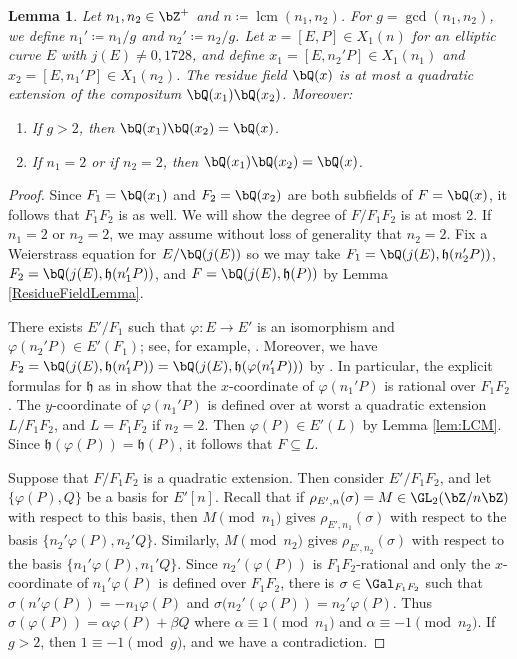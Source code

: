 \documentclass[11pt,reqno]{amsart}
\theoremstyle{plain}
\newtheorem{lemma}[theorem]{Lemma}
\theoremstyle{definition}
\DeclareMathOperator{\lcm}{lcm}
\newcommand{\Q}{\bQ}
\newcommand{\Z}{\bZ}
\begin{document}
\begin{lemma} \label{lem:compositum_res_fields}
Let $n_1,n_2 \in \Z^+$ and $n \coloneqq \lcm(n_1,n_2)$. For $g=\gcd(n_1,n_2)$, we define $n_1'\coloneqq n_1/g$ and $n_2'\coloneqq n_2/g$. Let $x=[E,P] \in X_1(n)$ for an elliptic curve $E$ with $j(E) \neq 0,1728$, and define $x_1=[E,n_2'P] \in X_1(n_1)$ and $x_2=[E,n_1'P] \in X_1(n_2)$. The residue field $\Q(x)$ is at most a quadratic extension of the compositum $\Q(x_1)\Q(x_2)$. Moreover:
\begin{enumerate}
\item If $g>2$, then $\Q(x_1)\Q(x_2)=\Q(x)$.
\item If $n_1=2$ or if $n_2=2$, then $\Q(x_1)\Q(x_2)=\Q(x)$.
\end{enumerate}
\end{lemma}

\begin{proof}
Since $F_1=\Q(x_1)$ and $F_2=\Q(x_2)$ are both subfields of $F=\Q(x)$, it follows that $F_1F_2$ is as well. We will show the degree of $F/F_1F_2$ is at most 2. If $n_1=2$ or $n_2=2$, we may assume without loss of generality that $n_2=2$. Fix a Weierstrass equation for $E/\Q(j(E))$ so we may take $F_1=\Q(j(E),\mathfrak{h}(n_2'P))$, $F_2=\Q(j(E),\mathfrak{h}(n_1'P))$, and $F=\Q(j(E),\mathfrak{h}(P))$ by Lemma \ref{ResidueFieldLemma}.

There exists $E'/F_1$ such that $\varphi:E \rightarrow E'$ is an isomorphism and $\varphi(n_2'P) \in E'(F_1)$; see, for example, \cite[p. 274, Proposition VI.3.2]{DR}. Moreover, we have $F_2= \Q(j(E),\mathfrak{h}(n_1'P))=\Q(j(E),\mathfrak{h}(\varphi(n_1'P)))$ by \cite[p. 107]{shimura}. In particular, the explicit formulas for $\mathfrak{h}$ as in \cite[p. 107]{shimura} show that the $x$-coordinate of $\varphi(n_1'P)$ is rational over $F_1F_2$. The $y$-coordinate of $\varphi(n_1'P)$ is defined over at worst a quadratic extension $L/F_1F_2$, and $L=F_1F_2$ if $n_2=2$. Then $\varphi(P) \in E'(L)$ by Lemma \ref{lem:LCM}. Since $\mathfrak{h}(\varphi(P))=\mathfrak{h}(P)$, it follows that $F \subseteq L$.

Suppose that $F/F_1F_2$ is a quadratic extension. Then consider $E'/F_1F_2$, and let $\{\varphi(P),Q\}$ be a basis for $E'[n]$. Recall that if $\rho_{E',n}(\sigma)=M \in \GL_2(\Z/n\Z)$ with respect to this basis, then $M \pmod{n_1}$ gives $\rho_{E',n_1}(\sigma)$ with respect to the basis $\{n_2'\varphi(P),n_2'Q\}$. Similarly, $M\pmod{n_2}$ gives $\rho_{E',n_2}(\sigma)$ with respect to the basis $\{n_1'\varphi(P),n_1'Q\}$.  Since $n_2'(\varphi(P))$ is $F_1F_2$-rational and only the $x$-coordinate of $n_1'\varphi(P)$ is defined over $F_1F_2$, there is $\sigma\in \Gal_{F_1F_2}$ such that $\sigma(n'\varphi(P))=-n_1\varphi(P)$ and $\sigma(n_2'(\varphi(P))=n_2'\varphi(P)$. Thus $\sigma(\varphi(P))=\alpha \varphi(P)+\beta Q$ where $\alpha \equiv 1 \pmod{n_1}$ and $\alpha \equiv -1 \pmod{n_2}$. If $g>2$, then $1 \equiv -1 \pmod{g}$, and we have a contradiction.
\end{proof}
\end{document}
